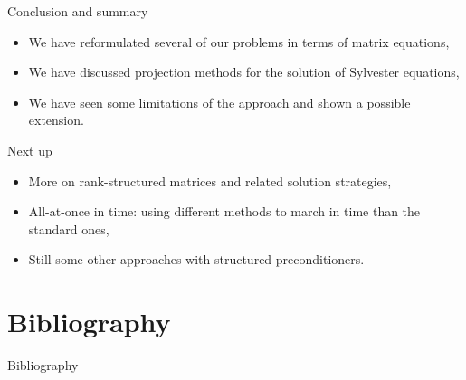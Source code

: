 \documentclass[aspectratio=169,xcolor=dvipsnames]{beamer}
\newcommand\unnumbered{\setbeamertemplate{footline}{}}%
\begin{document}
	\begin{frame}{Conclusion and summary}
	
	\begin{itemize}
		\item[\textcolor{success}{\faCheckCircle}] We have reformulated several of our problems in terms of matrix equations,
		\item[\textcolor{success}{\faCheckCircle}] We have discussed projection methods for the solution of Sylvester equations,
		\item[\textcolor{success}{\faCheckCircle}] We have seen some limitations of the approach and shown a possible extension.
	\end{itemize}

	Next up
	\begin{itemize}
		\item[\textcolor{todo}{\faClipboardList}] More on rank-structured matrices and related solution strategies,
		\item[\textcolor{todo}{\faClipboardList}] All-at-once in time: using different methods to march in time than the standard ones,
		\item[\textcolor{todo}{\faClipboardList}] Still some other approaches with structured preconditioners.
	\end{itemize}
	
	\end{frame}
	
	\section*{Bibliography}
	{\unnumbered
		\begin{frame}{Bibliography}
			\small
			\printbibliography
			
		\end{frame}
	}
\end{document}
